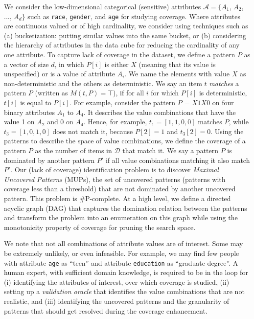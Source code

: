 We consider the low-dimensional categorical (sensitive) attributes $\mathcal{A} = \{A_1$, $A_2$, ..., $A_d\}$ such as {\tt \small race}, {\tt \small gender}, and {\tt \small age} for studying coverage. Where attributes are continuous valued or of high cardinality, we consider using techniques such as (a) bucketization: putting similar values into the same bucket, or (b) considering the hierarchy of attributes in the data cube for reducing the cardinality of any one attribute.
To capture lack of coverage in the dataset, we define a pattern $P$ as a vector of size $d$, in which $P[i]$ is either $X$ (meaning that its value is unspecified) or is a value of attribute $A_i$. We name the elements with value $X$ as non-deterministic and the others as deterministic.
We say an item $t$  {\em matches} a pattern $P$ (written as $M(t,P)= \top$), if for all $i$ for which $P[i]$ is deterministic, $t[i]$ is equal to $P[i]$.
For example, consider the pattern $P$ = $X1X0$ on four binary attributes $A_1$ to $A_4$.
It describes the value combinations that have the value 1 on $A_2$ and 0 on $A_4$.
Hence, for example, $t_1=[1,1,0,0]$ matches $P$, while $t_3=[1,0,1,0]$ does not match it, because $P[2]=1$ and $t_3[2]=0$.
Using the patterns to describe the space of value combinations, we define the coverage of a pattern $P$ as the number of items in $\mathcal{D}$ that match it.
We say a pattern $P$ is dominated by another pattern $P'$ if all value combinations matching it also match $P'$.
Our (lack of coverage) identification problem is to discover {\em Maximal Uncovered Patterns} (MUPs), the set of uncovered patterns (patterns with coverage less than a threshold) that are not dominated by another uncovered pattern.
This problem is \#P-complete.
At a high level, we define a directed acyclic graph (DAG) that captures the domination relation between the patterns and transform the problem into an enumeration on this graph while using the monotonicity property of coverage for pruning the search space.

We note that not all combinations of attribute values are of interest.  Some may be extremely unlikely, or even infeasible.  For example, we may find few people with attribute {\tt \small age} as ``teen'' and attribute {\tt \small education} as ``graduate degree''.
A human expert, with sufficient domain knowledge, is required to be in the loop for (i) identifying the attributes of interest, over which coverage is studied, (ii) setting up a {\em validation oracle} that identifies the value combinations that are not realistic, and (iii) identifying the uncovered patterns and the granularity of patterns that should get resolved during the coverage enhancement.

